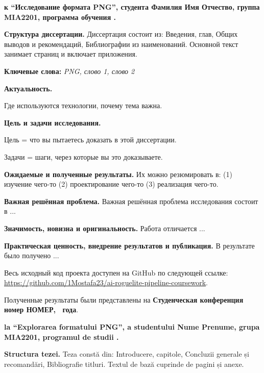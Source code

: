 \documentclass[a4paper,12pt]{report}
\newcommand{\uniGroupName}{MIA2201}
\newcommand{\authorName}{Nume Prenume}
\newcommand{\authorNameRu}{Фамилия Имя Отчество}
\newcommand{\docTitleRo}{Explorarea formatului PNG}
\newcommand{\docTitleRu}{Исследование формата PNG}
\newcommand{\yearOfWriting}{\the\year}
\newcommand{\conferencesList}{Студенческая конференция номер НОМЕР, \yearOfWriting~года}
\newcommand{\github}{\url{https://github.com/1Mostafa23/ai-roguelite-pipeline-coursework}}
\begin{document}
\titlePage

\clearpage
\tableofcontents


\textbf{к \docTypeRuDatelny{} \enquote{\docTitleRu{}}, студента \authorNameRu{}, группа \uniGroupName{}, программа обучения \programulDeStudiiRu.}

\textbf{Структура диссертации.}
Диссертация состоит из: Введения, \chapterCount{} глав, Общих выводов и рекомендаций, Библиографии из \bibliographyEntryCount{} наименований.
Основной текст занимает \usefulPageCount{} страниц и включает \anexeCount{} приложения.

\textbf{Ключевые слова:}
\textit{\acrshort{PNG}, слово 1, слово 2}

\textbf{Актуальность.}

Где используются технологии, почему тема важна.

\textbf{Цель и задачи исследования.}

Цель = что вы пытаетесь доказать в этой диссертации.

Задачи = шаги, через которые вы это доказываете.

\textbf{Ожидаемые и полученные результаты.}
Их можно резюмировать в:
(1) изучение чего-то
(2) проектирование чего-то
(3) реализация чего-то.

\textbf{Важная решённая проблема.}
Важная решённая проблема исследования состоит в ...

\textbf{Значимость, новизна и оригинальность.}
Работа отличается ...

\textbf{Практическая ценность, внедрение результатов и публикация.}
В результате было получено ...

Весь исходный код проекта доступен на GitHub по следующей ссылке: \github.

Полученные результаты были представлены на \textbf{\conferencesList}\cite{self}.


\textbf{la \docTypeRoNedefinit{} \enquote{\docTitleRo{}}, a studentului \authorName{}, grupa \uniGroupName{}, programul de studii \programulDeStudiiRo.}

\textbf{Structura tezei.}
Teza constă din: Introducere, \chapterCount{} capitole, Concluzii generale și recomandări, Bibliografie \bibliographyEntryCount{} titluri.
Textul de bază cuprinde \usefulPageCount{} de pagini și \anexeCount{} anexe.
\end{document}
